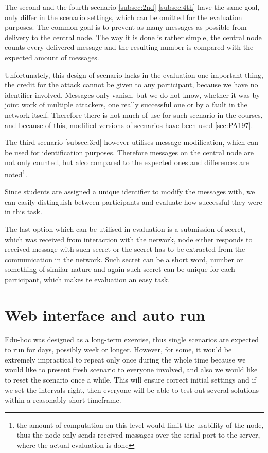 \documentclass[
  print, %
  Table,   %
  nolof,     %
  nolot,     %
           oneside
]{fithesis3}
\begin{document}
  The second and the fourth scenario \ref{subsec:2nd} \ref{subsec:4th} have the same goal, only differ in the scenario settings, which can be omitted for the evaluation purposes. The common goal is to prevent as many messages as possible from delivery to the central node. The way it is done is rather simple, the central node counts every delivered message and the resulting number is compared with the expected amount of messages.

  Unfortunately, this design of scenario lacks in the evaluation one important thing, the credit for the attack cannot be given to any participant, because we have no identifier involved. Messages only vanish, but we do not know, whether it was by joint work of multiple attackers, one really successful one or by a fault in the network itself. Therefore there is not much of use for such scenario in the courses, and because of this, modified versions of scenarios have been used \ref{sec:PA197}.

  The third scenario \ref{subsec:3rd} however utilises message modification, which can be used for identification purposes. Therefore messages on the central node are not only counted, but alco compared to the expected ones and differences are noted\footnote{the amount of computation on this level would limit the usability of the node, thus the node only sends received messages over the serial port to the server, where the actual evaluation is done}.

  Since students are assigned a unique identifier to modify the messages with, we can easily distinguish between participants and evaluate how successful they were in this task.

  The last option which can be utilised in evaluation is a submission of secret, which was received from interaction with the network, node either responds to received message with such secret or the secret has to be extracted from the communication in the network. Such secret can be a short word, number or something of similar nature and again such secret can be unique for each participant, which makes te evaluation an easy task.
  \section{Web interface and auto run}
  Edu-hoc was designed as a long-term exercise, thus single scenarios are expected to run for days, possibly week or longer. However, for some, it would be extremely impractical to repeat only once during the whole time because we would like to present fresh scenario to everyone involved,  and also we would like to reset the scenario once a while. This will ensure correct initial settings and if we set the intervals right, then everyone will be able to test out several solutions within a reasonably short timeframe.
\end{document}
